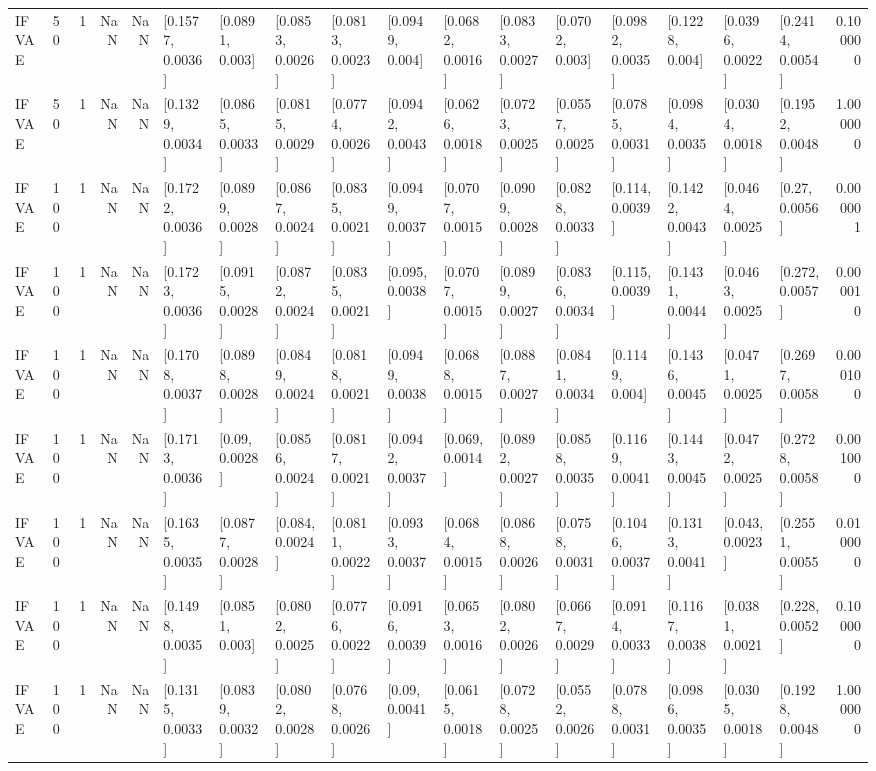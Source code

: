\begin{tabular}{lllrrllllllllllllr}
   IFVAE &   50 &     1 &   NaN &   NaN &  [0.1577, 0.0036] &   [0.0891, 0.003] &  [0.0853, 0.0026] &  [0.0813, 0.0023] &   [0.0949, 0.004] &  [0.0682, 0.0016] &  [0.0833, 0.0027] &   [0.0702, 0.003] &  [0.0982, 0.0035] &   [0.1228, 0.004] &  [0.0396, 0.0022] &  [0.2414, 0.0054] &  0.100000 \\
   IFVAE &   50 &     1 &   NaN &   NaN &  [0.1329, 0.0034] &  [0.0865, 0.0033] &  [0.0815, 0.0029] &  [0.0774, 0.0026] &  [0.0942, 0.0043] &  [0.0626, 0.0018] &  [0.0723, 0.0025] &  [0.0557, 0.0025] &  [0.0785, 0.0031] &  [0.0984, 0.0035] &  [0.0304, 0.0018] &  [0.1952, 0.0048] &  1.000000 \\
   IFVAE &  100 &     1 &   NaN &   NaN &  [0.1722, 0.0036] &  [0.0899, 0.0028] &  [0.0867, 0.0024] &  [0.0835, 0.0021] &  [0.0949, 0.0037] &  [0.0707, 0.0015] &  [0.0909, 0.0028] &  [0.0828, 0.0033] &   [0.114, 0.0039] &  [0.1422, 0.0043] &  [0.0464, 0.0025] &    [0.27, 0.0056] &  0.000001 \\
   IFVAE &  100 &     1 &   NaN &   NaN &  [0.1723, 0.0036] &  [0.0915, 0.0028] &  [0.0872, 0.0024] &  [0.0835, 0.0021] &   [0.095, 0.0038] &  [0.0707, 0.0015] &  [0.0899, 0.0027] &  [0.0836, 0.0034] &   [0.115, 0.0039] &  [0.1431, 0.0044] &  [0.0463, 0.0025] &   [0.272, 0.0057] &  0.000010 \\
   IFVAE &  100 &     1 &   NaN &   NaN &  [0.1708, 0.0037] &  [0.0898, 0.0028] &  [0.0849, 0.0024] &  [0.0818, 0.0021] &  [0.0949, 0.0038] &  [0.0688, 0.0015] &  [0.0887, 0.0027] &  [0.0841, 0.0034] &   [0.1149, 0.004] &  [0.1436, 0.0045] &  [0.0471, 0.0025] &  [0.2697, 0.0058] &  0.000100 \\
   IFVAE &  100 &     1 &   NaN &   NaN &  [0.1713, 0.0036] &    [0.09, 0.0028] &  [0.0856, 0.0024] &  [0.0817, 0.0021] &  [0.0942, 0.0037] &   [0.069, 0.0014] &  [0.0892, 0.0027] &  [0.0858, 0.0035] &  [0.1169, 0.0041] &  [0.1443, 0.0045] &  [0.0472, 0.0025] &  [0.2728, 0.0058] &  0.001000 \\
   IFVAE &  100 &     1 &   NaN &   NaN &  [0.1635, 0.0035] &  [0.0877, 0.0028] &   [0.084, 0.0024] &  [0.0811, 0.0022] &  [0.0933, 0.0037] &  [0.0684, 0.0015] &  [0.0868, 0.0026] &  [0.0758, 0.0031] &  [0.1046, 0.0037] &  [0.1313, 0.0041] &   [0.043, 0.0023] &  [0.2551, 0.0055] &  0.010000 \\
   IFVAE &  100 &     1 &   NaN &   NaN &  [0.1498, 0.0035] &   [0.0851, 0.003] &  [0.0802, 0.0025] &  [0.0776, 0.0022] &  [0.0916, 0.0039] &  [0.0653, 0.0016] &  [0.0802, 0.0026] &  [0.0667, 0.0029] &  [0.0914, 0.0033] &  [0.1167, 0.0038] &  [0.0381, 0.0021] &   [0.228, 0.0052] &  0.100000 \\
   IFVAE &  100 &     1 &   NaN &   NaN &  [0.1315, 0.0033] &  [0.0839, 0.0032] &  [0.0802, 0.0028] &  [0.0768, 0.0026] &    [0.09, 0.0041] &  [0.0615, 0.0018] &  [0.0728, 0.0025] &  [0.0552, 0.0026] &  [0.0788, 0.0031] &  [0.0986, 0.0035] &  [0.0305, 0.0018] &  [0.1928, 0.0048] &  1.000000 \\
\bottomrule
\end{tabular}
